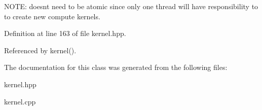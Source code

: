 N\+O\+TE\+: doesn\textquotesingle{}t need to be atomic since only one thread will have responsibility to to create new compute kernels. 

Definition at line 163 of file kernel.\+hpp.



Referenced by kernel().



The documentation for this class was generated from the following files\+:\begin{DoxyCompactItemize}
\item 
kernel.\+hpp\item 
kernel.\+cpp\end{DoxyCompactItemize}
